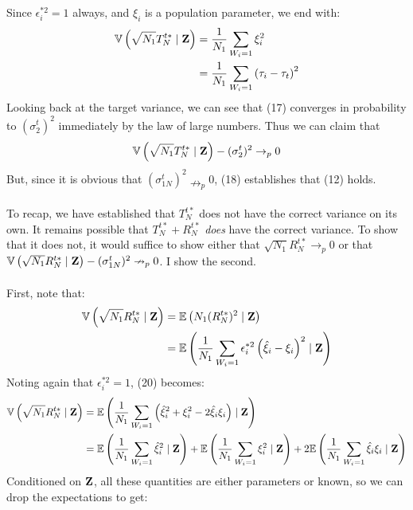 \documentclass[10pt,letterpaper]{article}
\begin{document}
Since $\epsilon_i^{*2} = 1$ always, and $\xi_i$ is a population parameter, we end with:
\begin{align}
\mathbb{V}\left( \sqrt{N_1} T_N^{t*} \mid \bold{Z} \right) &= \frac{1}{N_1} \sum_{W_i = 1} \xi_i^2 \nonumber \\
&= \frac{1}{N_1} \sum_{W_i = 1} \left( \tau_i - \tau_t \right)^2
\end{align}
Looking back at the target variance, we can see that (17) converges in probability to $(\sigma_2^t)^2$ immediately by the law of large numbers. Thus we can claim that
\begin{align}
\mathbb{V}\left( \sqrt{N_1} T_N^{t*} \mid \bold{Z} \right) - (\sigma^t_2)^2 \rightarrow_p 0
\end{align}
But, since it is obvious that $(\sigma_{1N}^t)^2 \nrightarrow_p 0$, (18) establishes that (12) holds.\\ \\
To recap, we have established that $T_N^{t*}$ does not have the correct variance on its own. It remains possible that $T_N^{t*} + R_N^{t*}$ \textit{does} have the correct variance. To show that it does not, it would suffice to show either that $\sqrt{N_1}R_{N}^{t*} \rightarrow_p 0$ or that $\mathbb{V}\left( \sqrt{N_1} R_N^{t*} \mid \bold{Z} \right) - (\sigma^t_{1N})^2 \nrightarrow_p 0$. I show the second.\\ \\
First, note that:
\begin{align}
\mathbb{V}\left( \sqrt{N_1} R_N^{t*} \mid \bold{Z} \right) &= \mathbb{E} \left( N_1 (R_N^{t*})^2 \mid \bold{Z} \right) \\
&= \mathbb{E} \left( \frac{1}{N_1} \sum_{W_i = 1} \epsilon_i^{*2} \left( \hat{\xi}_i - \xi_i \right)^2\mid \bold{Z} \right)
\end{align}
Noting again that $\epsilon_i^{*2} = 1$, (20) becomes:
\begin{align}
\mathbb{V}\left( \sqrt{N_1} R_N^{t*} \mid \bold{Z} \right) &=  \mathbb{E} \left( \frac{1}{N_1} \sum_{W_i = 1} \left( \hat{\xi}_i^2 + \xi_i^2 - 2 \hat{\xi}_i \xi_i \right) \mid \bold{Z} \right) \nonumber \\
&= \mathbb{E} \left( \frac{1}{N_1} \sum_{W_i = 1} \hat{\xi}_i^2 \mid \bold{Z} \right) + \mathbb{E}\left( \frac{1}{N_1} \sum_{W_i = 1} \xi_i^2 \mid \bold{Z} \right) + 2\mathbb{E} \left( \frac{1}{N_1} \sum_{W_i = 1} \hat{\xi}_i \xi_i \mid \bold{Z} \right)
\end{align}
Conditioned on $\bold{Z}$, all these quantities are either parameters or known, so we can drop the expectations to get:
\end{document}
